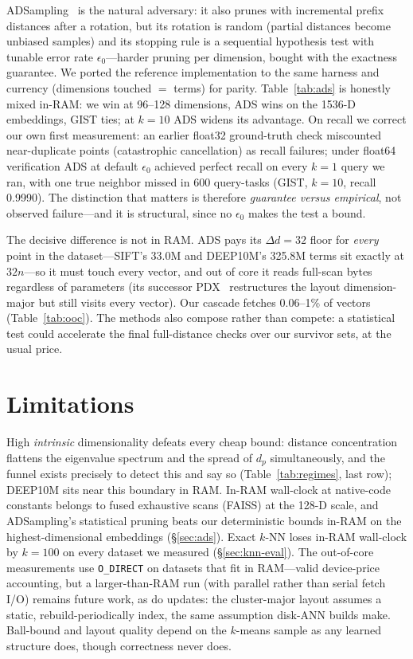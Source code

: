 \documentclass[sigconf,nonacm]{acmart}
\begin{document}
ADSampling~\cite{adsampling} is the natural adversary: it also prunes with
incremental prefix distances after a rotation, but its rotation is random
(partial distances become unbiased samples) and its stopping rule is a
sequential hypothesis test with tunable error rate $\epsilon_0$---harder
pruning per dimension, bought with the exactness guarantee. We ported the
reference implementation to the same harness and currency (dimensions
touched $=$ terms) for parity. Table~\ref{tab:ads} is honestly mixed
in-RAM: we win at 96--128 dimensions, ADS wins on the 1536-D embeddings,
GIST ties; at $k{=}10$ ADS widens its advantage. On recall we correct our
own first measurement: an earlier float32 ground-truth check miscounted
near-duplicate points (catastrophic cancellation) as recall failures;
under float64 verification ADS at default $\epsilon_0$ achieved perfect
recall on every $k{=}1$ query we ran, with one true neighbor missed in
600 query-tasks (GIST, $k{=}10$, recall 0.9990). The distinction that
matters is therefore \emph{guarantee versus empirical}, not observed
failure---and it is structural, since no $\epsilon_0$ makes the test a
bound.

The decisive difference is not in RAM. ADS pays its $\Delta d = 32$
floor for \emph{every} point in the dataset---SIFT's 33.0M and DEEP10M's
325.8M terms sit exactly at $32n$---so it must touch every vector, and
out of core it reads full-scan bytes regardless of parameters (its
successor PDX~\cite{pdx} restructures the layout dimension-major but
still visits every vector). Our cascade fetches 0.06--1\% of vectors
(Table~\ref{tab:ooc}). The methods also compose rather than compete: a
statistical test could accelerate the final full-distance checks over our
survivor sets, at the usual price.

\section{Limitations}

High \emph{intrinsic} dimensionality defeats every cheap bound: distance
concentration flattens the eigenvalue spectrum and the spread of $d_p$
simultaneously, and the funnel exists precisely to detect this and say so
(Table~\ref{tab:regimes}, last row); DEEP10M sits near this boundary in
RAM. In-RAM wall-clock at native-code constants belongs to fused
exhaustive scans (FAISS) at the 128-D scale, and ADSampling's statistical
pruning beats our deterministic bounds in-RAM on the highest-dimensional
embeddings (\S\ref{sec:ads}). Exact $k$-NN loses in-RAM wall-clock by
$k = 100$ on every dataset we measured (\S\ref{sec:knn-eval}). The
out-of-core measurements use \texttt{O\_DIRECT} on datasets that fit in
RAM---valid device-price accounting, but a
larger-than-RAM run (with parallel rather than serial fetch I/O) remains
future work, as do updates: the cluster-major layout assumes a static,
rebuild-periodically index, the same assumption disk-ANN builds make.
Ball-bound and layout quality depend on the $k$-means sample as any
learned structure does, though correctness never does.
\end{document}
